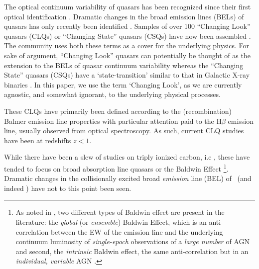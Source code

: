 \documentclass[a4paper,fleqn,usenatbib]{mnras}
\begin{document}
The optical continuum variability of quasars has been recognized since
their first optical identification
\citep[e.g.,][]{MatthewsSandage1963, MacLeod2012}.  Dramatic
changes in the broad emission lines (BELs) of quasars has only
recently been identified \citep[e.g., ][]{LaMassa2015}.  Samples of over
100 ``Changing Look'' quasars (CLQs) or ``Changing State'' quasars
(CSQs) have now been assembled \citep[e.g.][]{MacLeod2019,Graham2019}.
The community uses both these terms as a cover for the underlying
physics. For sake of argument, ``Changing Look'' quasars can
potentially be thought of as the extension to the BELs of quasar
continuum variability \citep[e.g., ][]{MacLeod2012} whereas the
``Changing State'' quasars (CSQs) have a `state-transition' similar to
that in Galactic X-ray binaries \citep[][]{NodaDone2018,
Ruan2019}. In this paper, we use the term `Changing Look', as we are
currently agnostic, and somewhat ignorant, to the underlying physical
processes.

These CLQs have primarily been defined according to the
(recombination) Balmer emission line properties with particular
attention paid to the H$\beta$ emission line, usually observed from
optical spectroscopy.  As such, current CLQ studies have been at
redshifts $z<1$.

While there have been a slew of studies on triply ionized carbon, i.e
\civ, these have tended to focus on broad absorption line quasars
\citep[BAL QSOs; see Table 1][]{Hemler2019} or the Baldwin Effect
\citep[BEff; ][]{Baldwin1977, Bian2012, Jensen2016,
Hamann2017}\footnote{As noted in \citet{Rakic2017}, two different
types of Baldwin effect are present in the literature: the {\it
global} (or {\it ensemble}) Baldwin Effect, which is an
anti-correlation between the EW of the emission line and the
underlying continuum luminosity of {\it single-epoch} observations of
a {\it large number} of AGN and second, the {\it intrinsic} Baldwin
effect, the same anti-correlation but in an {\it individual, variable}
AGN \citep{PoggePeterson1992}.}.  Dramatic changes in the
collisionally excited broad {\it emission} line (BEL) of \civ\ (and
indeed \ciii) have not to this point been seen.
\end{document}
